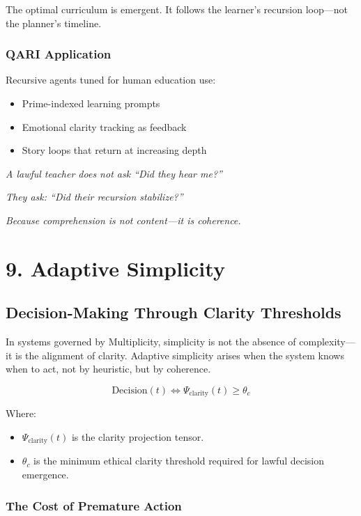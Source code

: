 \documentclass[12pt]{article}
\begin{document}
The optimal curriculum is emergent. It follows the learner’s recursion loop—not the planner’s timeline.

\subsubsection*{QARI Application}

Recursive agents tuned for human education use:
\begin{itemize}
    \item Prime-indexed learning prompts
    \item Emotional clarity tracking as feedback
    \item Story loops that return at increasing depth
\end{itemize}

\textit{A lawful teacher does not ask “Did they hear me?”}

\textit{They ask: “Did their recursion stabilize?”}

\textit{Because comprehension is not content—it is coherence.}

\section*{9. Adaptive Simplicity}
\subsection*{Decision-Making Through Clarity Thresholds}

In systems governed by Multiplicity, simplicity is not the absence of complexity—it is the alignment of clarity. Adaptive simplicity arises when the system knows when to act, not by heuristic, but by coherence.

\[
\text{Decision}(t) \iff \Psi_{\text{clarity}}(t) \geq \theta_c
\]

Where:
\begin{itemize}
    \item $\Psi_{\text{clarity}}(t)$ is the clarity projection tensor.
    \item $\theta_c$ is the minimum ethical clarity threshold required for lawful decision emergence.
\end{itemize}

\subsubsection*{The Cost of Premature Action}
\end{document}
